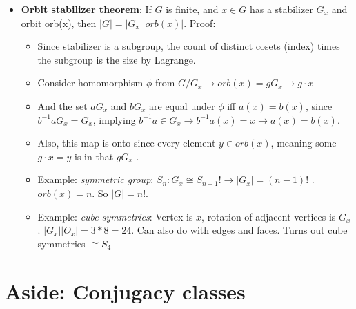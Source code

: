 \documentclass[11pt, oneside]{article}   	%
\begin{document}
\begin{itemize}
\item \textbf{Orbit stabilizer theorem}: If $G$ is finite, and $x \in G$ has a stabilizer $G_x$ and orbit orb(x), then $|G| = |G_x| |orb(x)|$.  Proof:
\begin{itemize}
\item Since stabilizer is a subgroup, the count of distinct cosets (index) times the subgroup is the size by Lagrange. 
\item Consider homomorphism $\phi$ from $G / G_x \rightarrow orb(x) = gG_x \rightarrow g \cdot x$
\item And the set $aG_x$ and $bG_x$ are equal under $\phi$  iff $a(x) = b(x)$, since $b^{-1}aG_x= G_x$, implying $b^{-1}a \in G_x \rightarrow b^{-1}a(x) = x \rightarrow a(x) = b(x)$.  
\item Also, this map is onto since every element $y \in orb(x)$, meaning some $g \cdot x = y$ is in that $gG_x$ .
\item Example: \emph{symmetric group}: $S_n: G_x \cong S_{n-1}! \rightarrow |G_x| = (n-1)!$ .  $orb(x) = n$.  So $|G| = n!$.
\item Example: \emph{cube symmetries}: Vertex is $x$, rotation of adjacent vertices is $G_x$. $|G_x| |O_x| = 3* 8 = 24$.  Can also do with edges and faces.  Turns out cube symmetries $\cong S_4$
\end{itemize}
\end{itemize}


\section{Aside: Conjugacy classes}
\end{document}
